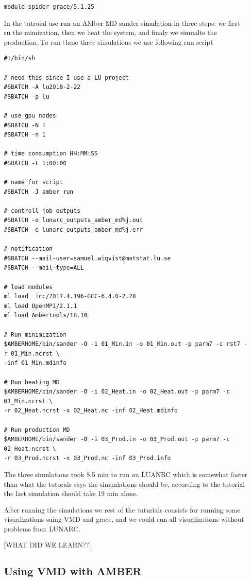 \documentclass[11pt]{article}
\begin{document}
\begin{verbatim}
module spider grace/5.1.25
\end{verbatim}

In the tutroial use run an AMber MD sander simulation in three steps: we
first ru the mimization, then we heat the system, and finaly we simualte
the production. To run these three simulations we use following
run-script

\begin{verbatim}
#!/bin/sh

# need this since I use a LU project
#SBATCH -A lu2018-2-22
#SBATCH -p lu

# use gpu nodes
#SBATCH -N 1
#SBATCH -n 1

# time consumption HH:MM:SS
#SBATCH -t 1:00:00

# name for script
#SBATCH -J amber_run

# controll job outputs
#SBATCH -o lunarc_outputs_amber_md%j.out
#SBATCH -e lunarc_outputs_amber_md%j.err

# notification
#SBATCH --mail-user=samuel.wiqvist@matstat.lu.se
#SBATCH --mail-type=ALL

# load modules
ml load  icc/2017.4.196-GCC-6.4.0-2.28
ml load OpenMPI/2.1.1
ml load Ambertools/18.10

# Run minimization
$AMBERHOME/bin/sander -O -i 01_Min.in -o 01_Min.out -p parm7 -c rst7 -r 01_Min.ncrst \
-inf 01_Min.mdinfo

# Run heating MD
$AMBERHOME/bin/sander -O -i 02_Heat.in -o 02_Heat.out -p parm7 -c 01_Min.ncrst \
-r 02_Heat.ncrst -x 02_Heat.nc -inf 02_Heat.mdinfo

# Run production MD
$AMBERHOME/bin/sander -O -i 03_Prod.in -o 03_Prod.out -p parm7 -c 02_Heat.ncrst \
-r 03_Prod.ncrst -x 03_Prod.nc -inf 03_Prod.info 
\end{verbatim}

The three simulations took 8.5 min to run on LUANRC which is somewhat
faster than what the tutorals says the simualations should be, according
to the tutorial the last simulation should take 19 min alone.

After running the simulations we rest of the tuturials consists for
running some visualizations suing VMD and grace, and we could run all
visualizations without problems from LUNARC.

{[}WHAT DID WE LEARN??{]}

    \subsection{Using VMD with AMBER}\label{using-vmd-with-amber}
\end{document}
